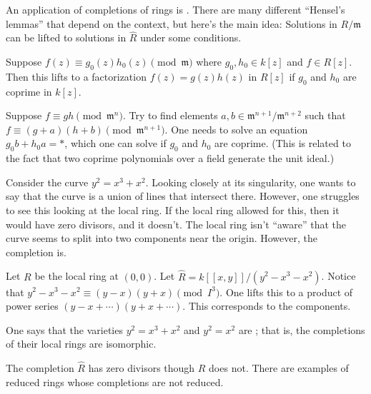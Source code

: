 \documentclass[11pt, oneside,margin=1in]{article}
\begin{document}
An application of completions of rings is . There are many different ``Hensel's lemmas'' that depend on the context, but here's the main idea: Solutions in $R/\mathfrak{m}$ can be lifted to solutions in $\widehat{R}$ under some conditions.

\begin{example}\label{}\text{}
Suppose $f(z)\equiv g_0(z) h_0(z)\pmod{\mathfrak{m}}$ where $g_0,h_0\in k[z]$ and $f\in R[z]$. Then this lifts to a factorization $f(z)=g (z)h (z)$ in $R[z]$ if $g_0$ and $h_0$ are coprime in $k[z]$.
\end{example}

\begin{esquisse}
	Suppose $f\equiv gh\pmod{\mathfrak{m}^n}$. Try to find elements $a,b\in \mathfrak{m}^{n+1}/\mathfrak{m}^{n+2}$ such that $f\equiv (g+a) (h+b)\pmod { \mathfrak{m}^{n+1}}$. One needs to solve an equation $g_0b+h_0a = *$, which one can solve if $g_0$ and $h_0$ are coprime. (This is related to the fact that two coprime polynomials over a field generate the unit ideal.)
\end{esquisse}

\begin{example}[ ]\label{}\text{}
Consider the curve $y^2 = x^3+x^2$. Looking closely at its singularity, one wants to say that the curve is a union of lines that intersect there. However, one struggles to see this looking at the local ring. If the local ring allowed for this, then it would have zero divisors, and it doesn't. The local ring isn't ``aware'' that the curve seems to split into two components near the origin. However, the completion is. 

Let $R$ be the local ring at $(0,0)$. Let $\widehat{R} = k [\![x,y]\!]/(y^2-x^3-x^2)$. Notice that $y^2-x^3-x^2\equiv (y-x) (y+x)\pmod {I^3}$. One lifts this to a product of power series $(y-x+\cdots) (y+x+\cdots)$. This corresponds to the components.
\end{example}

\begin{remark}
	One says that the varieties $y^2=x^3+x^2$ and $y^2=x^2$ are ; that is, the completions of their local rings are isomorphic.
\end{remark}

\begin{remark}
	The completion $\widehat{R}$ has zero divisors though $R$ does not. There are examples of reduced rings whose completions are not reduced.
\end{remark}
\end{document}
